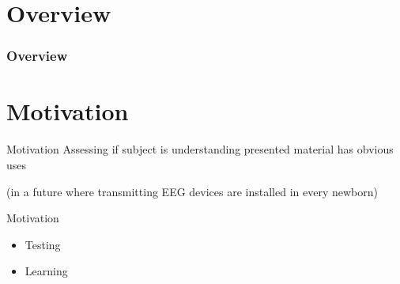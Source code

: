 % 
% 
%


\author{Will Foran\\ Jorge Vendries}

\institute{ } %

\subtitle{within Emotiv EGG recordings}

\date{\today}




\begin{frame}
  \maketitle
\end{frame}


\section*{Overview}

\begin{frame}\frametitle<presentation>{Overview}
  \tableofcontents 
\end{frame}


\section{Motivation}
\begin{frame}{Motivation}
Assessing if subject is understanding presented material has obvious uses \\
\begin{tiny}(in a future where transmitting EEG devices are installed in every newborn) \end{tiny}
    \begin{block}{Motivation} \begin{itemize}
	\item Testing 
	\item Learning
    \end{itemize} \end{block}
\end{frame}

